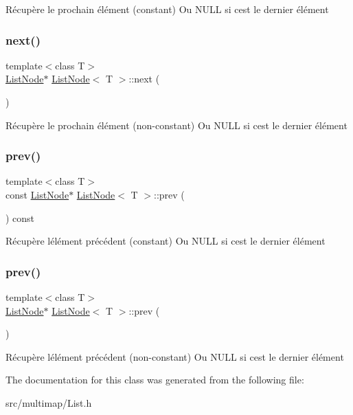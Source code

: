 Récupère le prochain élément (constant) Ou N\+U\+LL si c\textquotesingle{}est le dernier élément \mbox{\label{classListNode_aed1d6545a0edaa21796290ea8977cb53}} 
\subsubsection{\texorpdfstring{next()}{next()}\hspace{0.1cm}{\footnotesize\ttfamily [2/2]}}
{\footnotesize\ttfamily template$<$class T$>$ \\
\hyperlink{classListNode}{List\+Node}$\ast$ \hyperlink{classListNode}{List\+Node}$<$ T $>$\+::next (\begin{DoxyParamCaption}{ }\end{DoxyParamCaption})\hspace{0.3cm}{\ttfamily [inline]}}

Récupère le prochain élément (non-\/constant) Ou N\+U\+LL si c\textquotesingle{}est le dernier élément \mbox{\label{classListNode_a2365b3baf31c7507a86c810f40c922a2}} 
\subsubsection{\texorpdfstring{prev()}{prev()}\hspace{0.1cm}{\footnotesize\ttfamily [1/2]}}
{\footnotesize\ttfamily template$<$class T$>$ \\
const \hyperlink{classListNode}{List\+Node}$\ast$ \hyperlink{classListNode}{List\+Node}$<$ T $>$\+::prev (\begin{DoxyParamCaption}{ }\end{DoxyParamCaption}) const\hspace{0.3cm}{\ttfamily [inline]}}

Récupère l\textquotesingle{}élément précédent (constant) Ou N\+U\+LL si c\textquotesingle{}est le dernier élément \mbox{\label{classListNode_a6a80942f4de46fbe065062360e29fee6}} 
\subsubsection{\texorpdfstring{prev()}{prev()}\hspace{0.1cm}{\footnotesize\ttfamily [2/2]}}
{\footnotesize\ttfamily template$<$class T$>$ \\
\hyperlink{classListNode}{List\+Node}$\ast$ \hyperlink{classListNode}{List\+Node}$<$ T $>$\+::prev (\begin{DoxyParamCaption}{ }\end{DoxyParamCaption})\hspace{0.3cm}{\ttfamily [inline]}}

Récupère l\textquotesingle{}élément précédent (non-\/constant) Ou N\+U\+LL si c\textquotesingle{}est le dernier élément 

The documentation for this class was generated from the following file\+:\begin{DoxyCompactItemize}
\item 
src/multimap/List.\+h\end{DoxyCompactItemize}
